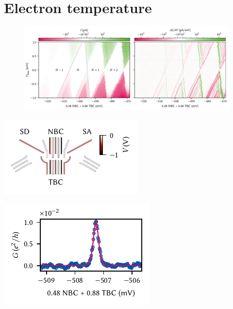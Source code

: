 \section{Electron temperature}\label{sec:setup:cooling:etemp}
\begin{figure}
    \centering
    \includegraphics{img/pdf/setup/diamonds}
    \caption[]{}
    \label{fig:setup:cooling:etemp:diamonds}
\end{figure}

\begin{marginfigure}
    \centering
    \includegraphics{img/pdf/setup/diamonds_gl}
    \caption[]{}
    \label{fig:setup:cooling:etemp:gl}
\end{marginfigure}

\begin{marginfigure}
    \centering
    \includegraphics{img/pdf/setup/coulomb_resonance}
    \caption[]{}
    \label{fig:setup:cooling:etemp:resonance}
\end{marginfigure}
